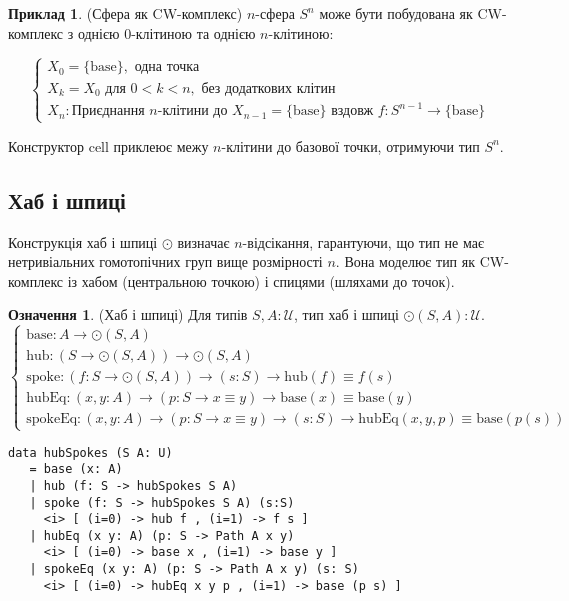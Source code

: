 \documentclass{article}
\theoremstyle{definition}
\newtheorem{definition}{Означення}
\newtheorem{example}{Приклад}
\begin{document}
\begin{example} (Сфера як CW-комплекс)
\( n \)-сфера \( S^n \) може бути побудована як CW-комплекс з
однією 0-клітиною та однією \( n \)-клітиною:

\[
\begin{cases}
X_0 = \{ \text{base} \}, \text{ одна точка} \\
X_k = X_0 \text{ для } 0 < k < n, \text{ без додаткових клітин} \\
X_n: \text{Приєднання } n\text{-клітини до } X_{n-1} = \{ \text{base} \} \text{ вздовж } f : S^{n-1} \to \{ \text{base} \}
\end{cases}
\]

Конструктор \( \text{cell} \) приклеює межу \( n \)-клітини
до базової точки, отримуючи тип \( S^n \).
\end{example}

\newpage
\subsection{Хаб і шпиці}
Конструкція хаб і шпиці \( \odot \) визначає \( n \)-відсікання,
гарантуючи, що тип не має нетривіальних гомотопічних груп вище
розмірності \( n \). Вона моделює тип як CW-комплекс із
хабом (центральною точкою) і спицями (шляхами до точок).

\begin{definition} (Хаб і шпиці)
Для типів \( S, A : \mathcal{U} \), тип хаб і шпиці \( \odot(S,A) : \mathcal{U} \).
\[
\begin{cases}
\text{base} : A \to \odot(S,A) \\
\text{hub} : (S \to \odot(S,A)) \to \odot(S,A) \\
\text{spoke} : (f : S \to \odot(S,A)) \to (s : S) \to \text{hub}(f) \equiv f(s) \\
\text{hubEq} : (x, y : A) \to (p : S \to x \equiv y) \to \text{base}(x) \equiv \text{base}(y) \\
\text{spokeEq} : (x, y : A) \to (p : S \to x \equiv y) \to (s : S) \to \text{hubEq}(x,y,p) \equiv \text{base}(p(s))
\end{cases}
\]
\begin{lstlisting}
data hubSpokes (S A: U)
   = base (x: A)
   | hub (f: S -> hubSpokes S A)
   | spoke (f: S -> hubSpokes S A) (s:S)
     <i> [ (i=0) -> hub f , (i=1) -> f s ]
   | hubEq (x y: A) (p: S -> Path A x y)
     <i> [ (i=0) -> base x , (i=1) -> base y ]
   | spokeEq (x y: A) (p: S -> Path A x y) (s: S)
     <i> [ (i=0) -> hubEq x y p , (i=1) -> base (p s) ]
\end{lstlisting}
\end{definition}
\end{document}
